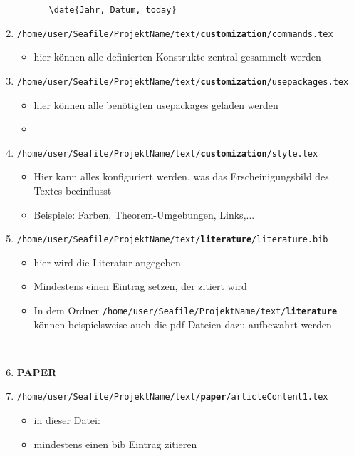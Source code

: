 \begin{enumerate}
\begin{itemize}
		~~~\texttt{\textbackslash date\{Jahr, Datum, today\}}
	\end{itemize}
	\item \texttt{/home/user/Seafile/ProjektName/text/\textbf{customization}/commands.tex}
	\begin{itemize}
		\item hier können alle definierten Konstrukte zentral gesammelt werden 
	\end{itemize}
	\item \texttt{/home/user/Seafile/ProjektName/text/\textbf{customization}/usepackages.tex}
	\begin{itemize}
		\item hier können alle benötigten usepackages geladen werden 
		\item[] 
	\end{itemize}
	\item \texttt{/home/user/Seafile/ProjektName/text/\textbf{customization}/style.tex}
	\begin{itemize}
		\item Hier kann alles konfiguriert werden, was das Erscheinigungsbild des Textes beeinflusst
		\item Beispiele: Farben, Theorem-Umgebungen, Links,...
	\end{itemize}
	\item \texttt{/home/user/Seafile/ProjektName/text/\textbf{literature}/literature.bib}
	\begin{itemize}
		\item hier wird die Literatur angegeben
		\item Mindestens einen Eintrag setzen, der zitiert wird
		\item In dem Ordner \texttt{/home/user/Seafile/ProjektName/text/\textbf{literature}} können beispielsweise auch die pdf Dateien dazu aufbewahrt werden
	\end{itemize}
	~\\
	\item[] \textbf{\large PAPER}
	\item \texttt{/home/user/Seafile/ProjektName/text/\textbf{paper}/articleContent1.tex}\\
	\begin{itemize}
		\item in dieser Datei: \texttt{}
		\item mindestens einen bib Eintrag zitieren 

\end{itemize}
\end{enumerate}
